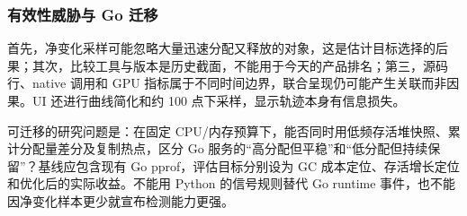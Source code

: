 \documentclass[UTF8,fontset=fandol,openany,11pt]{ctexbook}
\begin{document}
\subsubsection{有效性威胁与 Go 迁移}
首先，净变化采样可能忽略大量迅速分配又释放的对象，这是估计目标选择的后果；其次，比较工具与版本是历史截面，不能用于今天的产品排名；第三，源码行、native 调用和 GPU 指标属于不同时间边界，联合呈现仍可能产生关联而非因果。UI 还进行曲线简化和约 100 点下采样，显示轨迹本身有信息损失。

可迁移的研究问题是：在固定 CPU/内存预算下，能否同时用低频存活堆快照、累计分配量差分及复制热点，区分 Go 服务的“高分配但平稳”和“低分配但持续保留”？基线应包含现有 Go pprof，评估目标分别设为 GC 成本定位、存活增长定位和优化后的实际收益。不能用 Python 的信号规则替代 Go runtime 事件，也不能因净变化样本更少就宣布检测能力更强。
\end{document}
